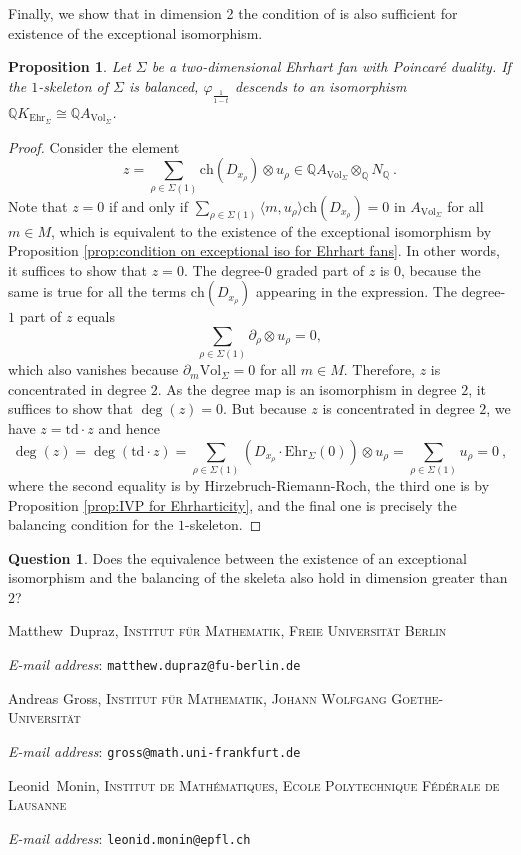 \documentclass[oneside]{amsart}
\makeatletter
\theoremstyle{plain}
\newtheorem{proposition}[theorem]{Proposition}
\theoremstyle{definition}
\newtheorem{question}[theorem]{Question}
\newcommand{\Q}{{\mathbb{Q}}}
\newcommand{\Vol}{{\mathrm{Vol}}}
\newcommand{\Ehr}{{\mathrm{Ehr}}}
\newcommand{\ch}{{\mathrm{ch}}}
\newcommand{\td}{{\mathrm{td}}}
\newcommand{\Addresses}{{
  \bigskip
  \footnotesize

  Matthew~Dupraz, \textsc{Institut für Mathematik, Freie Universität Berlin}\par\nopagebreak
  \textit{E-mail address}: \texttt{matthew.dupraz@fu-berlin.de}

  \medskip

  Andreas Gross, \textsc{Institut für Mathematik, Johann Wolfgang Goethe-Universität}\par\nopagebreak
  \textit{E-mail address}: \texttt{gross@math.uni-frankfurt.de}
  
  \medskip

  Leonid~Monin, \textsc{Institut de Math\'ematiques, Ecole Polytechnique F\'ed\'erale de Lausanne}\par\nopagebreak
  \textit{E-mail address}: \texttt{leonid.monin@epfl.ch}

}}
\makeatother
\begin{document}
Finally, we show that in dimension 2 the condition of  is also sufficient for existence of the exceptional isomorphism.

\begin{proposition}\label{prop:balanced-implies-exceptional}
Let $\Sigma$ be a two-dimensional Ehrhart fan with Poincaré duality. If the $1$-skeleton of $\Sigma$ is balanced, 
$\varphi_{\frac{1}{1 - t}}$ descends to an isomorphism $\Q K_{\Ehr_\Sigma}\cong \Q A_{\Vol_\Sigma}$.
\end{proposition}

\begin{proof}
Consider the element
\[
z=\sum_{\rho\in \Sigma(1)}\ch(D_{x_\rho})\otimes u_\rho \in \Q A_{\Vol_\Sigma} \otimes_\Q N_\Q \ .
\]
Note that $z=0$ if and only if $\sum_{\rho\in\Sigma(1)}\langle m,u_\rho\rangle \ch(D_{x_\rho})=0$ in $A_{\Vol_\Sigma}$ for all $m 
\in M$, which is equivalent to the existence of the exceptional isomorphism by Proposition \ref{prop:condition on exceptional iso for Ehrhart fans}. In other words, it suffices to show that $z=0$. The degree-$0$ graded part of $z$ is $0$, because the same is true for all the terms $\ch(D_{x_\rho})$ appearing in the expression. The degree-$1$ part of $z$ equals
\[
    \sum_{\rho\in\Sigma(1)}\partial_{\rho}\otimes u_\rho=0,
\]
which also vanishes because $\partial_m\Vol_\Sigma=0$ for all $m\in M$. Therefore, $z$ is concentrated in degree $2$. As the degree map is an isomorphism in degree $2$, it suffices to show that $\deg(z)=0$. But because $z$ is concentrated in degree $2$, we have $z=\td\cdot z$ and hence
\[
    \deg(z)= \deg(\td\cdot z)= \sum_{\rho\in \Sigma(1)} (D_{x_\rho}\cdot \Ehr_\Sigma(0)) \otimes u_\rho = \sum_{\rho\in\Sigma(1)}u_\rho =0 \ ,
\]
where the second equality is by Hirzebruch-Riemann-Roch, the third one is by Proposition \ref{prop:IVP for Ehrharticity}, and the final one is precisely the balancing condition for the $1$-skeleton.
\end{proof}

\begin{question}
Does the equivalence between the existence of an exceptional isomorphism and the balancing of the skeleta also hold in dimension greater than $2$?
\end{question}


\printbibliography

\Addresses
\end{document}
